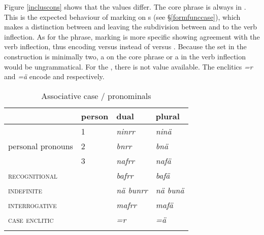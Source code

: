 Figure \ref{incluscons} shows that the  values differ. The core phrase is always in . This is the expected behaviour of  marking on s (see \S\ref{formfunccase}), which makes a distinction between  and  leaving the subdivision between  and  to the verb inflection. As for the  phrase,  marking is more specific showing agreement with the verb inflection, thus encoding  versus  instead of  versus . Because the set in the  construction is minimally two, a  on the core phrase or a  in the verb inflection would be ungrammatical. For the  , there is not   value available. The enclitics \emph{=r} and \emph{=ä} encode  and  respectively.

\begin{table}
\caption{Associative case / pronominals}
\label{comcase-table}
	\begin{tabularx}{\textwidth}{XXXl}
		\lsptoprule
		& {person} & {dual} & {plural} \\\midrule
		\multirow{3}{3cm}{{personal pronouns}} &1 &\emph{ninrr} &\emph{ninä}\\
		&2 &\emph{bnrr} &\emph{bnä}\\
		&3 &\emph{nafrr} &\emph{nafä}\\
		\textsc{recognitional}&&\emph{bafrr}&\emph{bafä}\\
		\textsc{indefinite}&&\emph{nä bunrr}&\emph{nä bunä}\\
		\textsc{interrogative}&&\emph{mafrr}&\emph{mafä}\\
		\textsc{case enclitic}&&\emph{=r}&\emph{=ä}\\
		\lspbottomrule
	\end{tabularx}
\end{table}%

